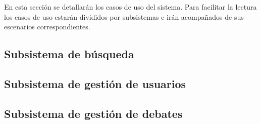 En esta sección se detallarán los casos de uso del sistema.  Para facilitar la lectura los casos de uso estarán divididos por subsistemas e irán acompañados de sus escenarios correspondientes.

\subsection{Subsistema de búsqueda}
\label{casos_uso_subsistema_busqueda}


\subsection{Subsistema de gestión de usuarios}
\label{casos_uso_subsistema_usuarios}


\subsection{Subsistema de gestión de debates}
\label{casos_uso_subsistema_debates}
